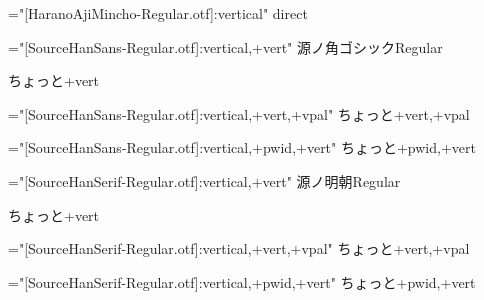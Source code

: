 \font\hmrdirect="[HaranoAjiMincho-Regular.otf]:vertical"
\hmrdirect
{}%
direct

\font\sar="[SourceHanSans-Regular.otf]:vertical,+vert"
\sar
源ノ角ゴシックRegular

ちょっと+vert

\font\sarvpal="[SourceHanSans-Regular.otf]:vertical,+vert,+vpal"
\sarvpal
ちょっと+vert,+vpal

\font\sarpwidvert="[SourceHanSans-Regular.otf]:vertical,+pwid,+vert"
\sarpwidvert
ちょっと+pwid,+vert

\font\ser="[SourceHanSerif-Regular.otf]:vertical,+vert"
\ser
源ノ明朝Regular

ちょっと+vert

\font\servpal="[SourceHanSerif-Regular.otf]:vertical,+vert,+vpal"
\servpal
ちょっと+vert,+vpal

\font\serpwidvert="[SourceHanSerif-Regular.otf]:vertical,+pwid,+vert"
\serpwidvert
ちょっと+pwid,+vert

\bye
